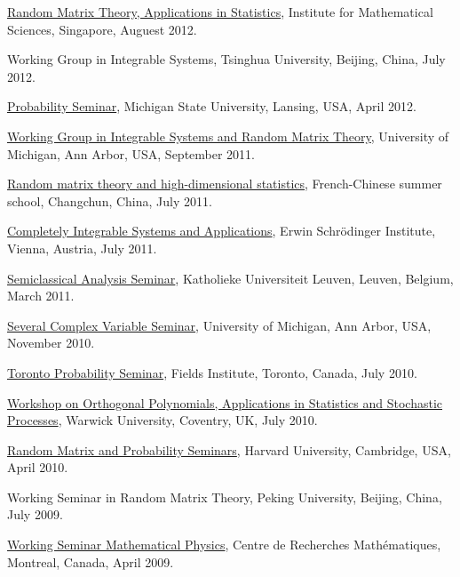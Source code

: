 \begin{item_list}
  \href{http://www2.ims.nus.edu.sg/Programs/012random/wk2.php}{Random Matrix Theory, Applications in Statistics}, Institute for Mathematical Sciences, Singapore, Auguest 2012.
\item
  Working Group in Integrable Systems, Tsinghua University, Beijing, China, July 2012.
\item
  \href{http://mathdata.msu.edu/Seminar/Recent.asp?s=928}{Probability Seminar}, Michigan State University, Lansing, USA, April 2012.
\item
  \href{http://www.math.lsa.umich.edu/seminars_events/events.php?eventdefid=43&dt_begin=2011-07-01&dt_end=2011-12-31}{Working Group in Integrable Systems and Random Matrix Theory}, University of Michigan, Ann Arbor, USA, September 2011.
\item
  \href{http://web.hku.hk/~jeffyao/ss/}{Random matrix theory and high-dimensional statistics},  French-Chinese summer school, Changchun, China, July 2011.
\item
  \href{http://www.esf.org/activities/esf-conferences/details/2011/confdetail369.html}{Completely Integrable Systems and Applications}, Erwin Schr\"{o}dinger Institute, Vienna, Austria, July 2011.
\item
  \href{http://wis.kuleuven.be/analyse/seminar-classical.html}{Semiclassical Analysis Seminar}, Katholieke Universiteit Leuven, Leuven, Belgium, March 2011.
\item
  \href{http://www.math.lsa.umich.edu/seminars/scv/}{Several Complex Variable Seminar}, University of Michigan, Ann Arbor, USA, November 2010.
\item
  \href{http://www.math.utoronto.ca/cms/toronto-probability-seminar/}{Toronto Probability Seminar}, Fields Institute, Toronto, Canada, July 2010.
\item
  \href{http://www2.warwick.ac.uk/fac/sci/statistics/crism/workshops/orthogonal-polynomials/}{Workshop on Orthogonal Polynomials, Applications in Statistics and Stochastic Processes}, Warwick University, Coventry, UK, July 2010.
\item
  \href{http://www.math.harvard.edu/cgi-bin/showtalk.pl}{Random Matrix and Probability Seminars}, Harvard University, Cambridge, USA, April 2010.
\item
  Working Seminar in Random Matrix Theory, Peking University, Beijing, China, July 2009.
\item
  \href{http://www.crm.umontreal.ca/cal/en/mois200804.html}{Working Seminar Mathematical Physics}, Centre de Recherches Math\'{e}matiques, Montreal, Canada, April 2009.

\end{item_list}
